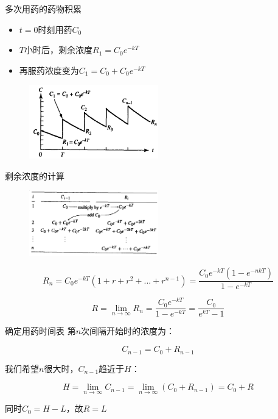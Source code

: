 \documentclass[mathserif, table]{beamer}
\begin{document}
\begin{frame}{多次用药的药物积累}
  \begin{itemize}
  \item $t=0$时刻用药$C_0$
  \item $T$小时后，剩余浓度$R_1 = C_0e^{-kT}$
  \item 再服药浓度变为$C_1=C_0+C_0e^{-kT}$
  \end{itemize}

  \begin{figure}
    \centering
    \includegraphics[width=0.5\textwidth]{ed.png}
  \end{figure}
  
\end{frame}

\begin{frame}{剩余浓度的计算}
  \begin{figure}
    \centering
    \includegraphics[width=0.5\textwidth]{rc.png}
  \end{figure}
  \[
  R_n = C_0e^{-kT}(1+r+r^2+...+r^{n-1}) = \frac{C_0e^{-kT}(1-e^{-nkT})}{1-e^{-kT}}
  \]

  \[
  R = \lim_{n \rightarrow \infty}R_n = \frac{C_0e^{-kT}}{1-e^{-kT}} = \frac{C_0}{e^{kT}-1}
  \]
  
\end{frame}

\begin{frame}{确定用药时间表}
  第$n$次间隔开始时的浓度为：

  \[
  C_{n-1} = C_0 + R_{n-1}
  \]
  
  我们希望$n$很大时，$C_{n-1}$趋近于$H$：
  
  \[
  H = \lim_{n \rightarrow \infty}C_{n-1} = \lim_{n \rightarrow \infty}(C_0+R_{n-1}) = C_0 + R
  \]
  
  同时$C_0 = H - L$，故$R=L$
  
\end{frame}
\end{document}
